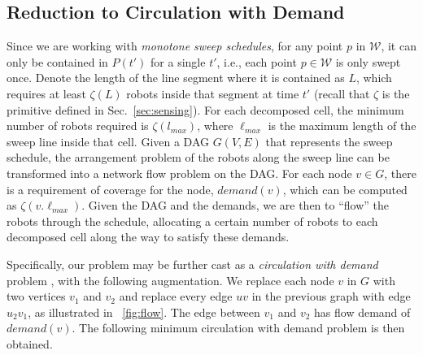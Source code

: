 \subsection{Reduction to Circulation with Demand}
Since we are working with \emph{monotone sweep schedules}, for any point $p$ in 
$\mathcal W$, it can only be contained in $P(t')$ for a single $t'$, i.e., each 
point $p \in \mathcal W$ is only swept once. 
%
Denote the length of the line segment where it is contained as $L$, which 
requires at least $\zeta(L)$ robots inside that segment at time $t'$
(recall that $\zeta$ is the primitive defined in Sec.~\ref{sec:sensing}).
%
For each decomposed cell, the minimum number of robots required is $\zeta(l_{max})$, where $\ell_{max}$ 
is the maximum length of the sweep line inside that cell.
%
Given a DAG $G(V,E)$ that represents the sweep schedule, the arrangement problem of the robots along the sweep line can be transformed into a network 
flow problem on the DAG.
%
For each node $v\in G$, there is a requirement of coverage for the node, 
$demand(v)$, which can be computed as $\zeta(v.\ell_{max})$.
%
Given the DAG and the demands, we are then to ``flow'' the robots through 
the schedule, allocating a certain number of robots to each decomposed cell 
along the way to satisfy these demands. 
%

Specifically, our problem may be further cast as a \emph{circulation with demand} 
problem \cite{kleinberg2006algorithm}, with the following augmentation. We replace 
each node $v$ in $G$ with two vertices $v_1$ and $v_2$ and replace every edge 
$uv$ in the previous graph with edge $u_2 v_1$, as illustrated in ~\ref{fig:flow}. 
The edge between $v_1$ and $v_2$ has flow demand of $demand(v)$. 
The following minimum circulation with demand problem is then obtained.

